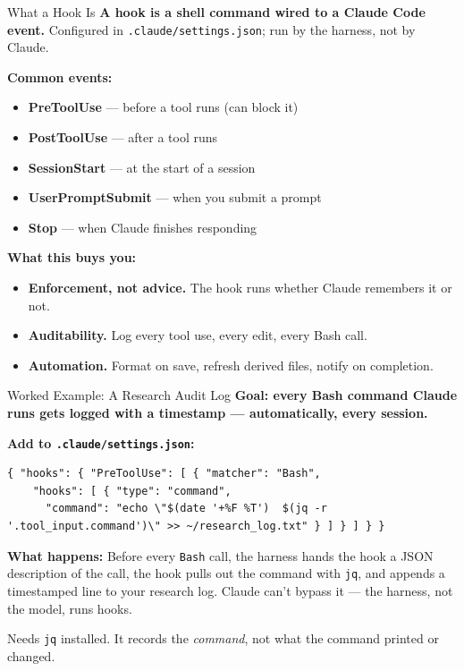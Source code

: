 \documentclass[aspectratio=169, 11pt]{beamer}
\begin{document}
\begin{frame}{What a Hook Is}
  \textbf{A hook is a shell command wired to a Claude Code event.} Configured in \texttt{.claude/settings.json}; run by the harness, not by Claude.

  \vspace{0.5em}
  \textbf{Common events:}
  \begin{itemize}\small
    \item \textbf{PreToolUse} --- before a tool runs (can block it)
    \item \textbf{PostToolUse} --- after a tool runs
    \item \textbf{SessionStart} --- at the start of a session
    \item \textbf{UserPromptSubmit} --- when you submit a prompt
    \item \textbf{Stop} --- when Claude finishes responding
  \end{itemize}

  \vspace{0.6em}
  \textbf{What this buys you:}
  \begin{itemize}\small
    \item \textbf{Enforcement, not advice.} The hook runs whether Claude remembers it or not.
    \item \textbf{Auditability.} Log every tool use, every edit, every Bash call.
    \item \textbf{Automation.} Format on save, refresh derived files, notify on completion.
  \end{itemize}
\end{frame}

\begin{frame}[fragile]{Worked Example: A Research Audit Log}
  \textbf{Goal: every Bash command Claude runs gets logged with a timestamp --- automatically, every session.}

  \vspace{0.4em}
  \textbf{Add to \texttt{.claude/settings.json}:}
  \begin{lstlisting}[basicstyle=\ttfamily\tiny]
{ "hooks": { "PreToolUse": [ { "matcher": "Bash",
    "hooks": [ { "type": "command",
      "command": "echo \"$(date '+%F %T')  $(jq -r '.tool_input.command')\" >> ~/research_log.txt" } ] } ] } }
  \end{lstlisting}

  \vspace{0.3em}
  \textbf{What happens:} Before every \texttt{Bash} call, the harness hands the hook a JSON description of the call, the hook pulls out the command with \texttt{jq}, and appends a timestamped line to your research log. Claude can't bypass it --- the harness, not the model, runs hooks.

  \vspace{0.3em}
  {\small Needs \texttt{jq} installed. It records the \emph{command}, not what the command printed or changed.}
\end{frame}
\end{document}
